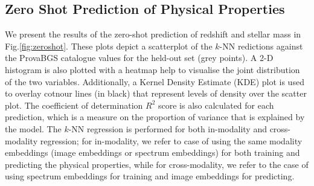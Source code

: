 \documentclass[draft, a4paper,12pt]{article}
\begin{document}



\subsection{Zero Shot Prediction of Physical Properties}
We present the results of the zero-shot prediction of redshift and stellar mass in Fig.\ref{fig:zeroshot}. These plots depict a scatterplot of the $k$-NN redictions against the ProvaBGS catalogue values for the held-out set (grey points). A 2-D histogram is also plotted with a heatmap help to visualise the joint distribution of the two variables. Additionally, a Kernel Density Estimate (KDE) plot is used to overlay cotnour lines (in black) that represent levels of density over the scatter plot. The coefficient of determination $R^2$ score is also calculated for each prediction, which is a measure on the proportion of variance that is explained by the model. The $k$-NN regression is performed for both in-modality and cross-modality regression; for in-modality, we refer to case of using the same modality embeddings (image embeddings or spectrum embeddings) for both training and predicting the physical properties, while for cross-modality, we refer to the case of using spectrum embeddings for training and image embeddings for predicting. 
\end{document}
